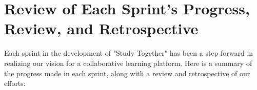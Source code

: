 \section{Review of Each Sprint's Progress, Review, and Retrospective}

Each sprint in the development of "Study Together" has been a step forward in realizing our vision for a collaborative learning platform. Here is a summary of the progress made in each sprint, along with a review and retrospective of our efforts:





